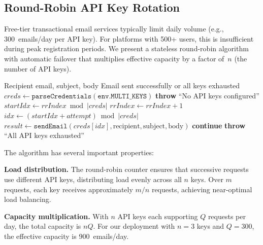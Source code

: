 \documentclass[11pt,a4paper]{article}
\theoremstyle{plain}
\theoremstyle{definition}
\begin{document}
\subsection{Round-Robin API Key Rotation}
\label{subsec:roundrobin}

Free-tier transactional email services typically limit daily volume (e.g., 300~emails/day per API key). For platforms with 500+ users, this is insufficient during peak registration periods. We present a stateless round-robin algorithm with automatic failover that multiplies effective capacity by a factor of~$n$ (the number of API keys).

\begin{algorithm}[htbp]
\caption{Round-Robin API Key Rotation with Failover}
\label{alg:roundrobin}
\small
\begin{algorithmic}[1]
\REQUIRE Recipient email, subject, body
\ENSURE Email sent successfully or all keys exhausted
\STATE $\mathit{creds} \gets \texttt{parseCredentials}(\texttt{env.MULTI\_KEYS})$
    \STATE \textbf{throw} ``No API keys configured''
\ENDIF
\STATE $\mathit{startIdx} \gets \mathit{rrIndex} \bmod |\mathit{creds}|$ 
\STATE $\mathit{rrIndex} \gets \mathit{rrIndex} + 1$ 
    \STATE $\mathit{idx} \gets (\mathit{startIdx} + \mathit{attempt}) \bmod |\mathit{creds}|$
    \STATE $\mathit{result} \gets \texttt{sendEmail}(\mathit{creds}[\mathit{idx}], \text{recipient}, \text{subject}, \text{body})$
        \RETURN {}
    \ENDIF
        \STATE \textbf{continue} 
    \ENDIF
\ENDFOR
\STATE \textbf{throw} ``All API keys exhausted''
\end{algorithmic}
\end{algorithm}

The algorithm has several important properties:

\textbf{Load distribution.} The round-robin counter ensures that successive requests use different API keys, distributing load evenly across all $n$ keys. Over $m$ requests, each key receives approximately $m/n$ requests, achieving near-optimal load balancing.

\textbf{Capacity multiplication.} With $n$ API keys each supporting $Q$ requests per day, the total capacity is $nQ$. For our deployment with $n = 3$ keys and $Q = 300$, the effective capacity is 900~emails/day.
\end{document}
